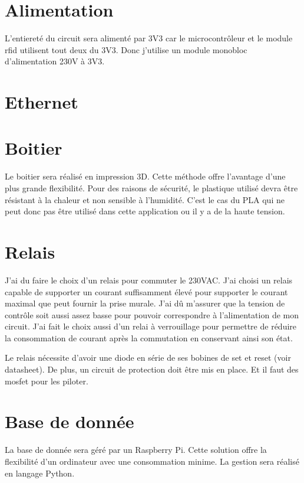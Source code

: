 \section{Alimentation}
L'entiereté du circuit sera alimenté par 3V3 car le microcontrôleur et le module rfid utilisent tout deux du 3V3. 
Donc j'utilise un module monobloc d'alimentation 230V à 3V3. 

\section{Ethernet}

\section{Boitier}
Le boitier sera réalisé en impression 3D. Cette méthode offre l'avantage d'une plus grande flexibilité.
Pour des raisons de sécurité, le plastique utilisé devra être résistant à la chaleur et non sensible à l'humidité. C'est le cas du PLA qui ne peut donc pas être utilisé dans cette application ou il y a de la haute tension.

\section{Relais}
J'ai du faire le choix d'un relais pour commuter le 230VAC. J'ai choisi un relais capable de supporter un courant suffisamment élevé pour supporter le courant maximal que peut fournir la prise murale. J'ai dû m'assurer que la tension de contrôle soit aussi assez basse pour pouvoir correspondre à l'alimentation de mon circuit.
J'ai fait le choix aussi d'un relai à verrouillage pour permettre de réduire la consommation de courant après la commutation en conservant ainsi son état.

Le relais nécessite d'avoir une diode en série de ses bobines de set et reset (voir datasheet).
De plus, un circuit de protection doit être mis en place. Et il faut des mosfet pour les piloter.

\section{Base de donnée}
La base de donnée sera géré par un Raspberry Pi. Cette solution offre la flexibilité d'un ordinateur avec une consommation minime. La gestion sera réalisé en langage Python.
